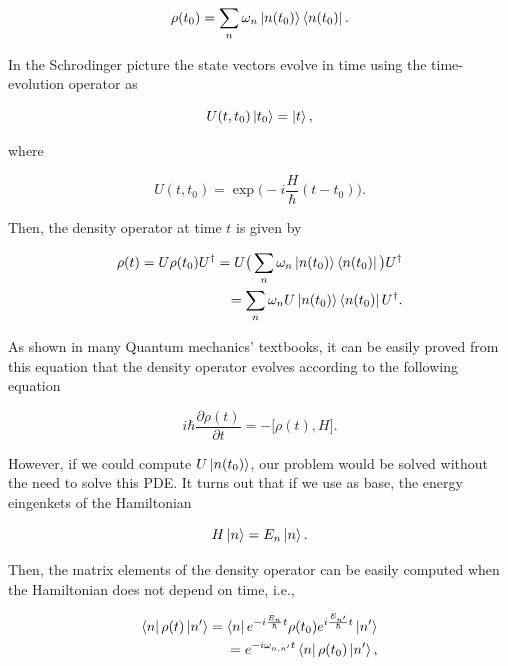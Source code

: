 \documentclass{article}
\begin{document}
\begin{equation}
    \rho(t_{0}) = \sum_{n} \omega_{n} \ket{n(t_{0})}\bra{n(t_{0})}.
\end{equation}

In the Schrodinger picture the state vectors evolve in time using the time-evolution operator as

\begin{equation}
    U(t, t_{0}) \ket{t_{0}} = \ket{t},
\end{equation}

where

\begin{equation}
    U(t,t_{0}) = \exp \bigg( -i \frac{H}{\hbar} (t-t_{0}) \bigg).
\end{equation}

Then, the density operator at time $t$ is given by

\begin{equation}
    \begin{split}
        \rho(t) = U \rho(t_{0}) U^{\dagger} = U \big( \sum_{n} \omega_{n} \ket{n(t_{0})}\bra{n(t_{0})} \big) U^{\dagger} \\ = \sum_{n} \omega_{n} U \ket{n(t_{0})}\bra{n(t_{0})} U^{\dagger}. 
    \end{split}
\end{equation}

As shown in many Quantum mechanics' textbooks, it can be easily proved from this equation that the density operator evolves according to the following equation

\begin{equation}
    i\hbar \frac{\partial \rho(t)}{\partial t} = - \big[\rho(t), H \big].
\end{equation}

However, if we could compute $U \ket{n(t_{0})}$, our problem would be solved without the need to solve this PDE. It turns out that if we use as base, the energy eingenkets of the Hamiltonian

\begin{equation}
    H \ket{n} = E_{n} \ket{n}.
\end{equation}

Then, the matrix elements of the density operator can be easily computed when the Hamiltonian does not depend on time, i.e.,

\begin{equation}\label{time_evol_density_h_independent_time}
   \begin{split}
       \bra{n} \rho(t) \ket{n'} = \bra{n} e^{-i\frac{E_{n}}{\hbar} t} \rho(t_{0}) e^{i\frac{E_{n'}}{\hbar} t} \ket{n'} \\ = e^{-i \omega_{n,n'} t} \bra{n} \rho(t_{0}) \ket{n'},
   \end{split}
\end{equation}
\end{document}
